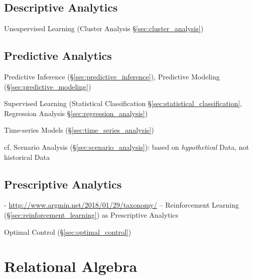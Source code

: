 \subsection{Descriptive Analytics}\label{sec:descriptive_analytics}

\fist Unsupervised Learning (Cluster Analysis \S\ref{sec:cluster_analysis})



\subsection{Predictive Analytics}\label{sec:predictive_analytics}

Predictive Inference (\S\ref{sec:predictive_inference}), Predictive Modeling
(\S\ref{sec:predictive_modeling})

\fist Supervised Learning (Statistical Classification
\S\ref{sec:statistical_classification}, Regression Analysis
\S\ref{sec:regression_analysis})

Time-series Models (\S\ref{sec:time_series_analysis})

cf. Scenario Analysis (\S\ref{sec:scenario_analysis}): based on
\emph{hypothetical} Data, not historical Data



\subsection{Prescriptive Analytics}\label{sec:prescriptive_analytics}

- \url{http://www.argmin.net/2018/01/29/taxonomy/} -- Reinforcement Learning
(\S\ref{sec:reinforcement_learning}) as Prescriptive Analytics

\fist Optimal Control (\S\ref{sec:optimal_control})



\section{Relational Algebra}\label{sec:relational_algebra}

